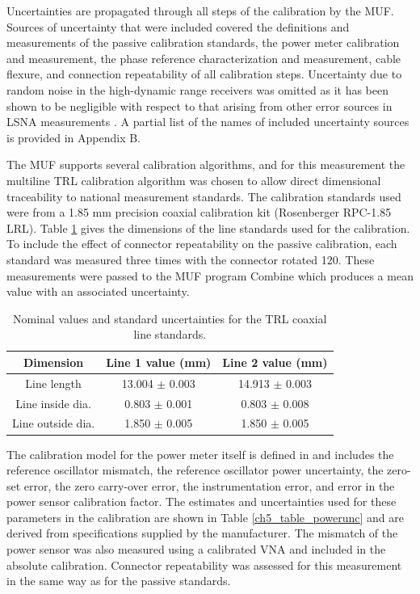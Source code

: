 \documentclass[../thesis/thesis.tex]{subfiles}
\begin{document}
Uncertainties are propagated through all steps of the calibration by the MUF. Sources of uncertainty that were included covered the definitions and measurements of the passive calibration standards, the power meter calibration and measurement, the phase reference characterization and measurement, cable flexure, and connection repeatability of all calibration steps. Uncertainty due to random noise in the high-dynamic range receivers was omitted as it has been shown to be negligible with respect to that arising from other error sources in LSNA measurements \cite{Blockley_2007}. A partial list of the names of included uncertainty sources is provided in Appendix B.

The MUF supports several calibration algorithms, and for this measurement the multiline TRL calibration algorithm \cite{Engen_1979, Marks_1991} was chosen to allow direct dimensional traceability to national measurement standards. The calibration standards used were from a 1.85 mm precision coaxial calibration kit (Rosenberger RPC-1.85 LRL). Table \ref{ch5_table_passivestds} gives the dimensions of the line standards used for the calibration. To include the effect of connector repeatability on the passive calibration, each standard was measured three times with the connector rotated 120\textdegree. These measurements were passed to the MUF program Combine which produces a mean value with an associated uncertainty.

\begin{table}[]
	\centering
	\caption{Nominal values and standard uncertainties for the TRL coaxial line standards.}
	\label{ch5_table_passivestds}
	\begin{tabular}{ccc}
		\hline
		Dimension         & Line 1 value (mm) & Line 2 value (mm) \\ \hline
		Line length       & 13.004 $\pm$ 0.003 & 14.913 $\pm$ 0.003 \\
		Line inside dia.  & 0.803 $\pm$ 0.001 & 0.803 $\pm$ 0.008 \\
		Line outside dia. & 1.850 $\pm$ 0.005 & 1.850 $\pm$ 0.005 \\ \hline            
	\end{tabular}
\end{table}

The calibration model for the power meter itself is defined in \cite{Keysight_2017} and includes the reference oscillator mismatch, the reference oscillator power uncertainty, the zero-set error, the zero carry-over error, the instrumentation error, and error in the power sensor calibration factor. The estimates and uncertainties used for these parameters in the calibration are shown in Table \ref{ch5_table_powerunc} and are derived from specifications supplied by the manufacturer. The mismatch of the power sensor was also measured using a calibrated VNA and included in the absolute calibration. Connector repeatability was assessed for this measurement in the same way as for the passive standards.
\end{document}
